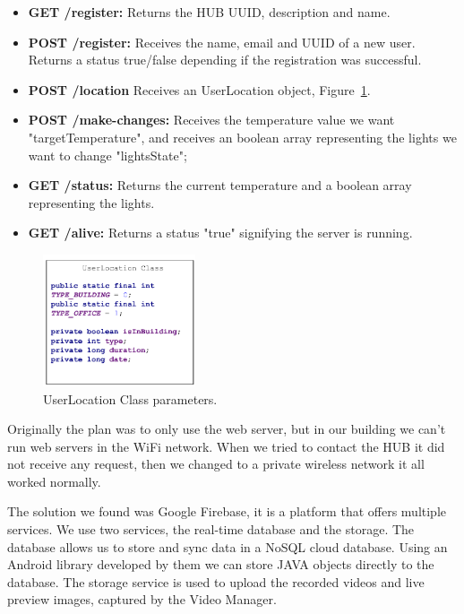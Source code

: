 \begin{itemize}
  \item \textbf{GET /register:} Returns the HUB UUID, description and name.
  \item \textbf{POST /register:} Receives the name, email and UUID of a new user. Returns a status true/false depending if the registration was successful.
  \item \textbf{POST /location} Receives an UserLocation object, Figure~\ref{user_location_class}.
  \item \textbf{POST /make-changes:} Receives the temperature value we want "targetTemperature", and receives an boolean array representing the lights we want to change "lightsState";
   \item \textbf{GET /status:} Returns the current temperature and a boolean array representing the lights.
   \item \textbf{GET /alive:} Returns a status "true" signifying the server is running.
\end{itemize}






\begin{figure}[h]
\centering
\includegraphics[width=0.4\textwidth]{Figures/userlocation_class}
\caption{UserLocation Class parameters.}
\label{user_location_class}
\end{figure}



Originally the plan was to only use the web server, but in our building we can't run web servers in the WiFi network. When we tried to contact the HUB it did not receive any request, then we changed to a private wireless network it all worked normally.

The solution we found was Google Firebase, it is a platform that offers multiple services. We use two services, the real-time database and the storage.
The database allows us to store and sync data in a NoSQL cloud database. Using an Android library developed by them we can store JAVA objects directly to the database. The storage service is used to upload the recorded videos and live preview images, captured by the Video Manager.

